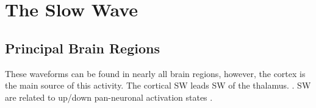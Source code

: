 

\section*{The Slow Wave}

\subsection*{Principal Brain Regions}
These waveforms can be found in nearly all brain regions, however, the cortex is the main source of this activity.  
The cortical SW leads SW of the thalamus.
\cite{Mak-McCully2017}.  
SW are related to up/down pan-neuronal activation states \cite{Steriade2001}.
